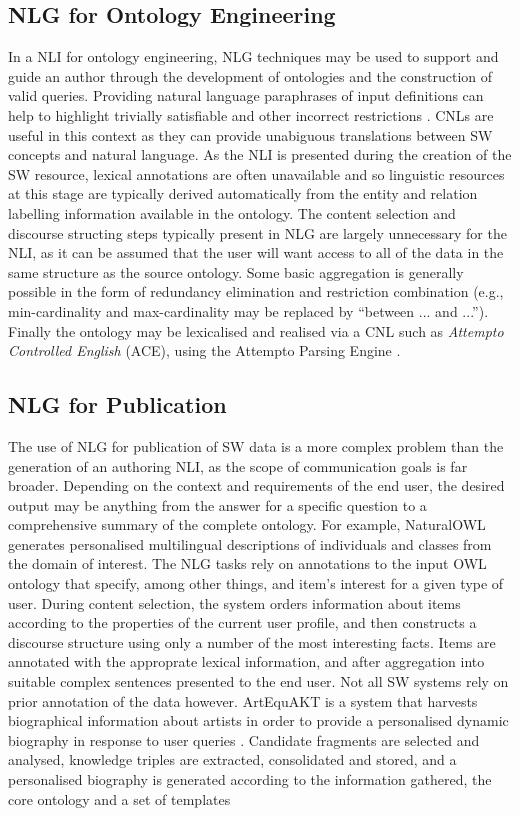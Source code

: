 \documentclass{acm_proc_article-sp}
\begin{document}
\subsection{NLG for Ontology Engineering}
In a NLI for ontology engineering, NLG techniques may be used to support and guide an author through the development of ontologies and the construction of valid queries. Providing natural language paraphrases of input definitions can help to highlight trivially satisfiable and other incorrect restrictions \cite{pizzas}. CNLs are useful in this context as they can provide unabiguous translations between SW concepts and natural language. As the NLI is presented during the creation of the SW resource, lexical annotations are often unavailable and so linguistic resources at this stage are typically derived automatically from the entity and relation labelling information available in the ontology.
The content selection and discourse structing steps typically present in NLG are largely unnecessary for the NLI, as it can be assumed that the user will want access to all of the data in the same structure as the source ontology. Some basic aggregation is generally possible in the form of redundancy elimination and restriction combination (e.g., min-cardinality and max-cardinality may be replaced by ``between ... and ...''). Finally the ontology may be lexicalised and realised via a CNL such as \textit{Attempto Controlled English} (ACE), using the Attempto Parsing Engine \cite{43}. 

\subsection{NLG for Publication}
The use of NLG for publication of SW data is a more complex problem than the generation of an authoring NLI, as the scope of communication goals is far broader. Depending on the context and requirements of the end user, the desired output may be anything from the answer for a specific question to a comprehensive summary of the complete ontology.
For example, NaturalOWL \cite{56} generates personalised multilingual descriptions of individuals and classes from the domain of interest. The NLG tasks rely on annotations to the input OWL ontology that specify, among other things, and item's interest for a given type of user. During content selection, the system orders information about items according to the properties of the current user profile, and then constructs a discourse structure using only a number of the most interesting facts. Items are annotated with the approprate lexical information, and after aggregation into suitable complex sentences presented to the end user.
Not all SW systems rely on prior annotation of the data however. ArtEquAKT is a system that harvests biographical information about artists in order to provide a personalised dynamic biography in response to user queries \cite{121}. Candidate fragments are selected and analysed, knowledge triples are extracted, consolidated and stored, and a personalised biography is generated according to the information gathered, the core ontology and a set of templates
\end{document}

